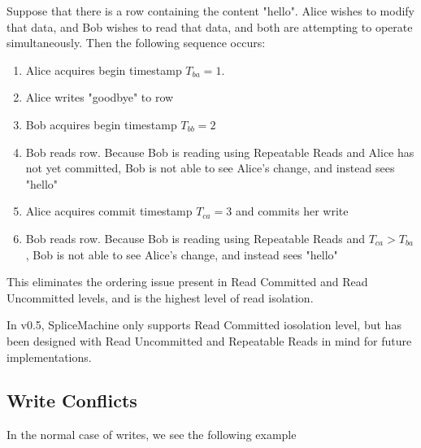 \begin{exmp}
				Suppose that there is a row containing the content "hello". Alice wishes to modify that data, and Bob wishes to read that data, and both are attempting to operate simultaneously. Then the following sequence occurs:
				\begin{enumerate}
					\item Alice acquires begin timestamp $T_{ba} = 1$.
					\item Alice writes "goodbye" to row
					\item Bob acquires begin timestamp $T_{bb} = 2$
					\item Bob reads row. Because Bob is reading using Repeatable Reads and Alice has not yet committed, Bob is not able to see Alice's change, and instead sees "hello"
					\item Alice acquires commit timestamp $T_{ca} = 3$ and commits her write	
					\item Bob reads row. Because Bob is reading using Repeatable Reads and $T_{ca} > T_{ba}$, Bob is not able to see Alice's change, and instead sees "hello"
				\end{enumerate}
\end{exmp}
This eliminates the ordering issue present in Read Committed and Read Uncommitted levels, and is the highest level of read isolation.

In v0.5, SpliceMachine only supports Read Committed iosolation level, but has been designed with Read Uncommitted and Repeatable Reads in mind for future implementations.

\subsection{Write Conflicts}
In the normal case of writes, we see the following example

